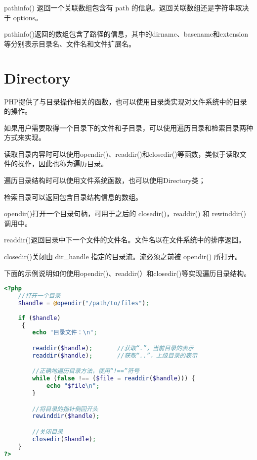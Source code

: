 pathinfo() 返回一个关联数组包含有 path 的信息。返回关联数组还是字符串取决于 options。



pathinfo()返回的数组包含了路径的信息，其中的dirname、basename和extension等分别表示目录名、文件名和文件扩展名。






\section{Directory}

PHP提供了与目录操作相关的函数，也可以使用目录类实现对文件系统中的目录的操作。

如果用户需要取得一个目录下的文件和子目录，可以使用遍历目录和检索目录两种方式来实现。


读取目录内容时可以使用opendir()、readdir()和closedir()等函数，类似于读取文件的操作，因此也称为遍历目录。

\begin{compactitem}
\item 遍历目录结构时可以使用文件系统函数，也可以使用Directory类；
\item 检索目录可以返回包含目录结构信息的数组。
\end{compactitem}

\begin{compactitem}
\item opendir()打开一个目录句柄，可用于之后的 closedir()，readdir() 和 rewinddir() 调用中。

\item readdir()返回目录中下一个文件的文件名。文件名以在文件系统中的排序返回。

\item closedir()关闭由 dir\_handle 指定的目录流。流必须之前被 opendir() 所打开。

\end{compactitem}

下面的示例说明如何使用opendir()、readdir(）和closedir()等实现遍历目录结构。

\begin{lstlisting}[language=PHP]
<?php
	//打开一个目录
	$handle = @opendir("/path/to/files");
	
	if ($handle)
     {
		echo "目录文件：\n";

		readdir($handle);		//获取“.”，当前目录的表示
		readdir($handle);		//获取“..”，上级目录的表示

		//正确地遍历目录方法，使用“!==”符号
		while (false !== ($file = readdir($handle))) {
			echo "$file\n";
		}

		//将目录的指针倒回开头
		rewinddir($handle);

		//关闭目录
		closedir($handle);
	}
?>
\end{lstlisting}


